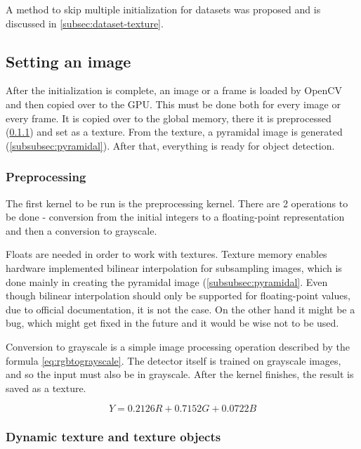 A method to skip multiple initialization for datasets was proposed and is discussed in \ref{subsec:dataset-texture}.

\subsection{Setting an image}

After the initialization is complete, an image or a frame is loaded by OpenCV and then copied over to the GPU. This must be done both for every image or every frame. It is copied over to the global memory, there it is preprocessed (\ref{subsubsec:grayscale}) and set as a texture. From the texture, a pyramidal image is generated (\ref{subsubsec:pyramidal}). After that, everything is ready for object detection.

\subsubsection{Preprocessing} \label{subsubsec:grayscale} 

The first kernel to be run is the preprocessing kernel. There are 2 operations to be done - conversion from the initial integers to a floating-point representation and then a conversion to grayscale.

Floats are needed in order to work with textures. Texture memory enables hardware implemented bilinear interpolation for subsampling images, which is done mainly in creating the pyramidal image (\ref{subsubsec:pyramidal}. Even though bilinear interpolation should only be supported for floating-point values, due to official documentation, it is not the case. On the other hand it might be a bug, which might get fixed in the future and it would be wise not to be used.

Conversion to grayscale is a simple image processing operation described by the formula \eqref{eq:rgbtograyscale}. The detector itself is trained on grayscale images, and so the input must also be in grayscale. After the kernel finishes, the result is saved as a texture.

\begin{equation} \label{eq:rgbtograyscale}
Y=0.2126R + 0.7152G + 0.0722B
\end{equation}

\subsubsection{Dynamic texture and texture objects}\label{subsubsec:dynamic-texture}

